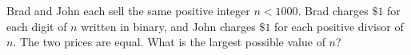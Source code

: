 Brad and John each sell the same positive integer $n<1000$. Brad charges $\$1$ for each digit of $n$ written in binary, and John charges $\$1$ for each positive divisor of $n$. The two prices are equal. What is the largest possible value of $n$?
